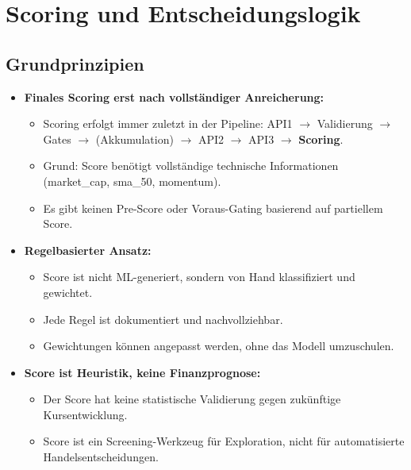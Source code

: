 \section{Scoring und Entscheidungslogik}

\subsection{Grundprinzipien}
\begin{itemize}
  \item \textbf{Finales Scoring erst nach vollständiger Anreicherung:} %
    \begin{itemize}
      \item Scoring erfolgt immer zuletzt in der Pipeline: API1 $\rightarrow$ Validierung $\rightarrow$ Gates $\rightarrow$ (Akkumulation) $\rightarrow$ API2 $\rightarrow$ API3 $\rightarrow$ \textbf{Scoring}. %
      \item Grund: Score benötigt vollständige technische Informationen (market\_cap, sma\_50, momentum).
      \item Es gibt keinen Pre-Score oder Voraus-Gating basierend auf partiellem Score.
    \end{itemize}
  \item \textbf{Regelbasierter Ansatz:} %
    \begin{itemize}
      \item Score ist nicht ML-generiert, sondern von Hand klassifiziert und gewichtet.
      \item Jede Regel ist dokumentiert und nachvollziehbar.
      \item Gewichtungen können angepasst werden, ohne das Modell umzuschulen.
    \end{itemize}
  \item \textbf{Score ist Heuristik, keine Finanzprognose:} %
    \begin{itemize}
      \item Der Score hat keine statistische Validierung gegen zukünftige Kursentwicklung.
      \item Score ist ein Screening-Werkzeug für Exploration, nicht für automatisierte Handelsentscheidungen.
    \end{itemize}
\end{itemize}

